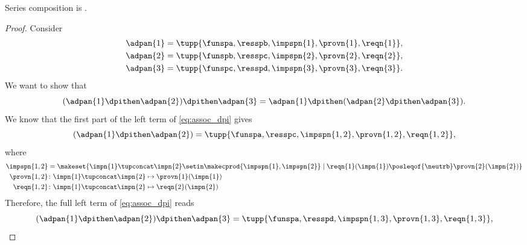 

\begin{lemma}
    Series composition is .
\end{lemma}
\begin{proof}
    Consider
    \begin{equation}
        \begin{aligned}
            \adpan{1} & = \tupp{\funspa,\resspb,\impspn{1},\provn{1},\reqn{1}}, \\
            \adpan{2} & = \tupp{\funspb,\resspc,\impspn{2},\provn{2},\reqn{2}}, \\
            \adpan{3} & = \tupp{\funspc,\resspd,\impspn{3},\provn{3},\reqn{3}}.
        \end{aligned}
    \end{equation}
    We want to show that
    \begin{equation}
        \label{eq:assoc_dpi}
        (\adpan{1}\dpithen \adpan{2})\dpithen \adpan{3}=\adpan{1}\dpithen (\adpan{2}\dpithen \adpan{3}).
    \end{equation}
    We know that the first part of the left term of \cref{eq:assoc_dpi} gives
    \begin{equation}
        (\adpan{1} \dpithen \adpan{2})
        =
        \tupp{ \funspa,\resspc,\impspn{1,2},\provn{1,2},\reqn{1,2}},
    \end{equation}
    where
    \begin{align}
        \impspn{1, 2} & = \makeset{ \impn{1} \tupconcat \impn{2} \setin \makecprod{\impspn{1}, \impspn{2}} \mid \reqn{1}(\impn{1}) \posleqof{\neutrb} \provn{2}(\impn{2})} \\
        \provn{1,2}   & \colon \impn{1} \tupconcat \impn{2} \mapsto \provn{1}(\impn{1}) \\
        \reqn{1,2}    & \colon \impn{1} \tupconcat \impn{2} \mapsto \reqn{2}(\impn{2})
    \end{align}
    Therefore, the full left term of \cref{eq:assoc_dpi} reads
    \begin{equation}
        \label{eq:dpi_ass_1}
        (\adpan{1} \dpithen \adpan{2})\dpithen \adpan{3}=\tupp{ \funspa,\resspd,\impspn{1,3},\provn{1,3},\reqn{1,3}},
    \end{equation}

\end{proof}
